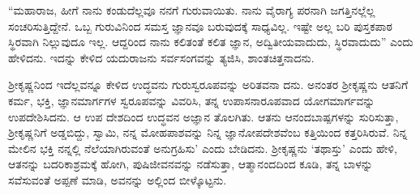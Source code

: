 “ಮಹಾರಾಜ, ಹೀಗೆ ನಾನು ಕಂಡುದೆಲ್ಲವೂ ನನಗೆ ಗುರುವಾಯಿತು. ನಾನು ವೈರಾಗ್ಯ ಪರನಾಗಿ ಜಗತ್ತಿನಲ್ಲೆಲ್ಲ ಸಂಚರಿಸುತ್ತಿದ್ದೇನೆ. ಒಬ್ಬ ಗುರುವಿನಿಂದ ಸಮಸ್ತ ಜ್ಞಾನವೂ ಬರುವುದಕ್ಕೆ ಸಾಧ್ಯವಿಲ್ಲ. ಇಷ್ಟೇ ಅಲ್ಲ ಬರಿ ಪುಸ್ತಕಪಾಠ ಸ್ಥಿರವಾಗಿ ನಿಲ್ಲುವುದೂ ಇಲ್ಲ. ಆದ್ದರಿಂದ ನಾನು ಕಲಿತಂತೆ ಕಲಿತ ಜ್ಞಾನ, ಅದ್ವಿತೀಯವಾದುದು, ಸ್ಥಿರವಾದುದು” ಎಂದು ಹೇಳಿದನು. ಇದನ್ನು ಕೇಳಿದ ಯದುರಾಜನು ಸರ್ವಸಂಗವನ್ನು ತ್ಯಜಿಸಿ, ಶಾಂತಚಿತ್ತನಾದನು.

ಶ್ರೀಕೃಷ್ಣನಿಂದ ಇದೆಲ್ಲವನ್ನೂ ಕೇಳಿದ ಉದ್ಧವನು ಗುರುಸ್ವರೂಪವನ್ನು ಅರಿತವನಾ ದನು. ಅನಂತರ ಶ್ರೀಕೃಷ್ಣನು ಆತನಿಗೆ ಕರ್ಮ, ಭಕ್ತಿ, ಜ್ಞಾನಮಾರ್ಗಗಳ ಸ್ವರೂಪವನ್ನು ವಿವರಿಸಿ, ತನ್ನ ಉಪಾಸನಾರೂಪವಾದ ಯೋಗಮಾರ್ಗವನ್ನು ಉಪದೇಶಿಸಿದನು. ಆ ಉಪ ದೇಶದಿಂದ ಉದ್ಧವನ ಅಜ್ಞಾನ ತೊಲಗಿತು. ಆತನು ಆನಂದಬಾಷ್ಪಗಳನ್ನು ಸುರಿಸುತ್ತಾ, ಶ್ರೀಕೃಷ್ಣನಿಗೆ ಅಡ್ಡಬಿದ್ದು, ಸ್ವಾಮಿ, ನನ್ನ ಮೋಹಪಾಶವನ್ನು ನಿನ್ನ ಜ್ಞಾನೋಪದೇಶವೆಂಬ ಕತ್ತಿಯಿಂದ ಕತ್ತರಿಸಿರುವೆ. ನಿನ್ನ ಮೇಲಿನ ಭಕ್ತಿ ನನ್ನಲ್ಲಿ ನೆಲೆಯಾಗಿರುವಂತೆ ಅನುಗ್ರಹಿಸು’ ಎಂದು ಬೇಡಿದನು. ಶ್ರೀಕೃಷ್ಣನು ‘ತಥಾಸ್ತು’ ಎಂದು ಹೇಳಿ, ಆತನನ್ನು ಬದರಿಕಾಶ್ರಮಕ್ಕೆ ಹೋಗಿ, ಪುಷಿಜೀವನವನ್ನು ನಡೆಸುತ್ತಾ, ಆತ್ಮಾನಂದದಿಂದ ಕೂಡಿ, ತನ್ನ ಬಾಳನ್ನು ಸವೆಸುವಂತೆ ಅಪ್ಪಣೆ ಮಾಡಿ, ಅವನನ್ನು ಅಲ್ಲಿಂದ ಬೀಳ್ಕೊಟ್ಟನು.

